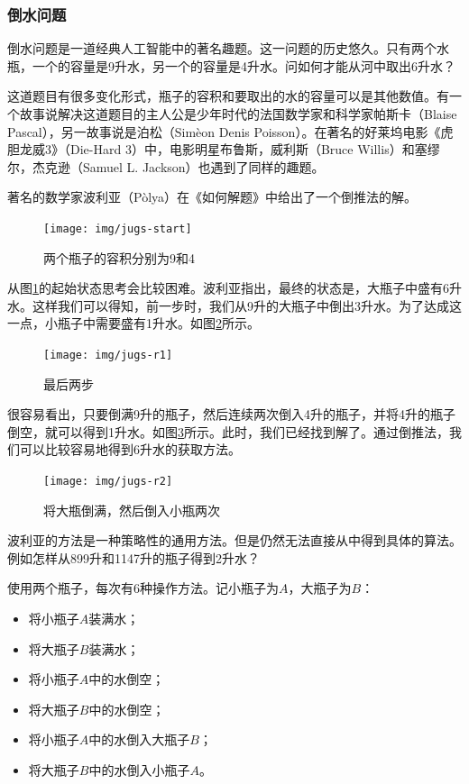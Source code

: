 \documentclass[b5paper]{ctexart}
\begin{document}
\subsubsection{倒水问题}

倒水问题是一道经典人工智能中的著名趣题。这一问题的历史悠久。只有两个水瓶，一个的容量是9升水，另一个的容量是4升水。问如何才能从河中取出6升水？

这道题目有很多变化形式，瓶子的容积和要取出的水的容量可以是其他数值。有一个故事说解决这道题目的主人公是少年时代的法国数学家和科学家帕斯卡（Blaise Pascal），另一故事说是泊松（Sim\`{e}on Denis Poisson）。在著名的好莱坞电影《虎胆龙威3》（Die-Hard 3）中，电影明星布鲁斯，威利斯（Bruce Willis）和塞缪尔，杰克逊（Samuel L. Jackson）也遇到了同样的趣题。

著名的数学家波利亚（P\`{o}lya）在《如何解题》中给出了一个倒推法的解\cite{how-to-solve-it}。

\begin{figure}[htbp]
 \centering
 \texttt{[image: img/jugs-start]}
 \caption{两个瓶子的容积分别为9和4}
 \label{fig:jugs-start}
\end{figure}

从图\ref{fig:jugs-start}的起始状态思考会比较困难。波利亚指出，最终的状态是，大瓶子中盛有6升水。这样我们可以得知，前一步时，我们从9升的大瓶子中倒出3升水。为了达成这一点，小瓶子中需要盛有1升水。如图\ref{fig:jugs-r1}所示。

\begin{figure}[htbp]
 \centering
 \texttt{[image: img/jugs-r1]}
 \caption{最后两步}
 \label{fig:jugs-r1}
\end{figure}

很容易看出，只要倒满9升的瓶子，然后连续两次倒入4升的瓶子，并将4升的瓶子倒空，就可以得到1升水。如图\ref{fig:jugs-r2}所示。此时，我们已经找到解了。通过倒推法，我们可以比较容易地得到6升水的获取方法。

\begin{figure}[htbp]
 \centering
 \texttt{[image: img/jugs-r2]}
 \caption{将大瓶倒满，然后倒入小瓶两次}
 \label{fig:jugs-r2}
\end{figure}

波利亚的方法是一种策略性的通用方法。但是仍然无法直接从中得到具体的算法。例如怎样从899升和1147升的瓶子得到2升水？

使用两个瓶子，每次有6种操作方法。记小瓶子为$A$，大瓶子为$B$：

\begin{itemize}
\item 将小瓶子$A$装满水；
\item 将大瓶子$B$装满水；
\item 将小瓶子$A$中的水倒空；
\item 将大瓶子$B$中的水倒空；
\item 将小瓶子$A$中的水倒入大瓶子$B$；
\item 将大瓶子$B$中的水倒入小瓶子$A$。
\end{itemize}
\end{document}
